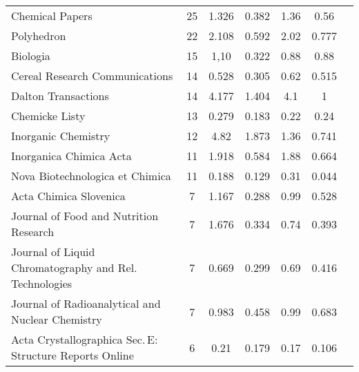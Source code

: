 {{\begin{longtable}[c]{lcccccc}
  Chemical Papers                                                                    & 25     & 1.326   & 0.382 &  1.36      & 0.56                  \\
  Polyhedron                                                                         & 22     & 2.108   & 0.592 &  2.02      & 0.777                 \\
  Biologia                                                                           & 15     & 1,10    & 0.322 &  0.88      & 0.88                  \\
  Cereal Research Communications                                                     & 14     & 0.528   & 0.305 &  0.62      & 0.515                 \\
  Dalton Transactions                                                                & 14     & 4.177   & 1.404 &  4.1       & 1                     \\[1ex]
  Chemicke Listy                                                                     & 13     & 0.279   & 0.183 &  0.22      & 0.24                  \\
  Inorganic Chemistry                                                                & 12     & 4.82    & 1.873 &  1.36      & 0.741                 \\
  Inorganica Chimica Acta                                                            & 11     & 1.918   & 0.584 &  1.88      & 0.664                 \\
  Nova Biotechnologica et Chimica                                                    & 11     & 0.188   & 0.129 &  0.31      & 0.044                 \\
  Acta Chimica Slovenica                                                             & 7      & 1.167   & 0.288 &  0.99      & 0.528                 \\[1ex]
  Journal of Food and Nutrition Research                                             & 7      & 1.676   & 0.334 &  0.74      & 0.393                 \\
  Journal of Liquid Chromatography and Rel. Technologies                             & 7      & 0.669   & 0.299 &  0.69      & 0.416                 \\
  Journal of Radioanalytical and Nuclear Chemistry                                     & 7      & 0.983   & 0.458 &  0.99      & 0.683                 \\
  Acta Crystallographica Sec.\,E: Structure Reports Online                           & 6      & 0.21    & 0.179 &  0.17      & 0.106                 \\

\end{longtable}}}
